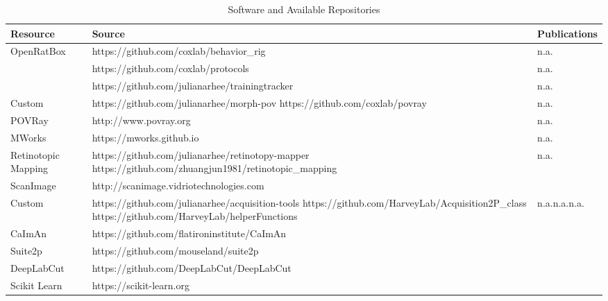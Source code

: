 \begin{table}[ht]
  \caption{Software and Available Repositories}
  \centering
  \footnotesize
  \begin{tabular}{ p{1.8cm}p{7.7cm}p{3.9cm}  }
    \toprule
    Resource & Source & Publications \\
    \midrule
    OpenRatBox  & https://github.com/coxlab/behavior\_rig & n.a. \\ 
                & https://github.com/coxlab/protocols & n.a. \\ 
                & https://github.com/julianarhee/trainingtracker & n.a. \\ 
    \midrule
    Custom  & https://github.com/julianarhee/morph-pov\newline 
             https://github.com/coxlab/povray & n.a.\newline \citet{Zoccolan2009} \\
    \addlinespace[0.05cm]
    POVRay  & http://www.povray.org & n.a. \\
    \addlinespace[0.05cm]
    MWorks  & https://mworks.github.io & n.a. \\
    \midrule
    Retinotopic Mapping & https://github.com/julianarhee/retinotopy-mapper\newline 
              https://github.com/zhuangjun1981/retinotopic\_mapping & n.a.\newline \citet{Zhuang2017} \\
    \midrule
    ScanImage   & http://scanimage.vidriotechnologies.com & \citet{Pologruto2003} \\ 
    \addlinespace[0.05cm]
    Custom & https://github.com/julianarhee/acquisition-tools\newline
                   https://github.com/HarveyLab/Acquisition2P\_class\newline
                   https://github.com/HarveyLab/helperFunctions & n.a.\newline n.a.\newline n.a.\\
    \midrule           
    CaImAn & https://github.com/flatironinstitute/CaImAn & \citet{Giovannucci2019}\newline \citet{Pnevmatikakis2019} \\
    \addlinespace[0.05cm]
    Suite2p & https://github.com/mouseland/suite2p & \citet{Pachitariu2017suite2p} \\
    \addlinespace[0.05cm]
    DeepLabCut   & https://github.com/DeepLabCut/DeepLabCut & \citet{Mathis2018}\newline \citet{Nath2019} \\
    \addlinespace[0.05cm]
    Scikit Learn   & https://scikit-learn.org & \citet{Pedregosa2011} \\
    \bottomrule
  \end{tabular}
  \label{tab:software}
\end{table}

